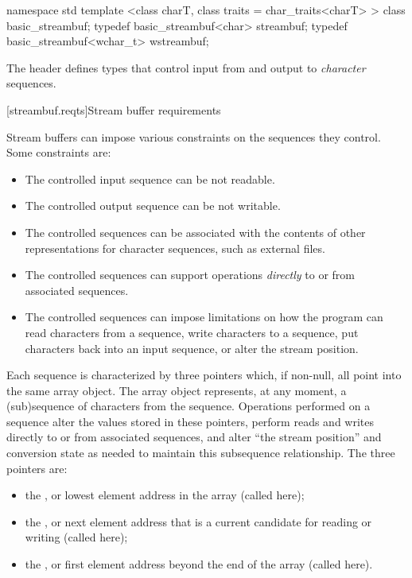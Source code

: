 %
%
%
%
\begin{codeblock}
namespace std {
  template <class charT, class traits = char_traits<charT> >
    class basic_streambuf;
  typedef basic_streambuf<char>     streambuf;
  typedef basic_streambuf<wchar_t> wstreambuf;
}
\end{codeblock}

\pnum
The header
defines types that control input from and output to
\textit{character}
sequences.

[streambuf.reqts]{Stream buffer requirements}

\pnum
Stream buffers can impose various constraints on the sequences they control.
Some constraints are:
\begin{itemize}
\item
The controlled input sequence can be not readable.
\item
The controlled output sequence can be not writable.
\item
The controlled sequences can be associated with the contents of other
representations for character sequences, such as external files.
\item
The controlled sequences can support operations
\textit{directly}
to or from associated sequences.
\item
The controlled sequences can impose limitations on how the program can
read characters from a sequence,
write characters to a sequence,
put characters back into an input sequence, or
alter the stream position.
\end{itemize}

\pnum
Each sequence is characterized by three pointers which, if non-null,
all point into the same
array object.
The array object represents, at any moment,
a (sub)sequence of characters from the sequence.
Operations performed on a sequence alter the values stored in these pointers,
perform reads and writes directly to or from associated sequences, and
alter ``the stream position'' and conversion state as needed to
maintain this subsequence relationship.
The three pointers are:
\begin{itemize}
\item
the
,
or lowest element address in the array
(called  here);
\item
the
,
or next element address that is a current
candidate for reading or writing (called  here);
\item
the
,
or first element address beyond the end of
the array (called  here).
\end{itemize}

